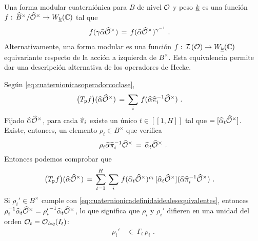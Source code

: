 Una forma modular cuaterni\'{o}nica para $B$ de nivel $\cal{O}$ y peso
$\peso{k}$ es una funci\'{o}n
\begin{math}
	f:\,\Idfin{B}/\Idfin{\cal{O}}\rightarrow W_{\peso{k}}(\bb{C})
\end{math}
tal que
\begin{align*}
	f(\gamma\hhat{\alpha}\Idfin{\cal{O}}) & \,=\,
		f(\hhat{\alpha}\Idfin{\cal{O}})^{\gamma^{-1}}
	\text{ .}
\end{align*}
%
Alternativamente, una forma modular es una funci\'{o}n
$f:\,\ideales{\cal{O}}\rightarrow W_{\peso{k}}(\bb{C})$ equivariante respecto
de la acci\'{o}n a izquierda de $B^{\times}$. Esta equivalencia permite dar una
descripci\'{o}n alternativa de los operadores de Hecke.

Seg\'{u}n \eqref{eq:cuaternionicasoperadorcoclase},
\begin{align*}
	\big(T_{\frak{p}}f\big)(\hhat{\alpha}\Idfin{\cal{O}}) & \,=\,
		\sum_{i}\,f(\hhat{\alpha}\hhat{\pi}_{i}^{-1}\Idfin{\cal{O}})
	\text{ .}
\end{align*}
%
Fijado $\hhat{\alpha}\Idfin{\cal{O}}$, para cada $\hhat{\pi}_{i}$ existe un
\'{u}nico $t\in [\![1,H]\!]$ tal que
\begin{math}
	[\hhat\alpha\hhat\pi_i^{-1}\Idfin{\cal O}]=
		[\hhat\alpha_t\Idfin{\cal O}]
\end{math}. Existe, entonces, un elemento $\rho_{i}\in B^{\times}$ que verifica
\begin{equation}
	\label{eq:cuaternionicadefinidaidealesequivalentes}
	\rho_{i}\hhat{\alpha}\hhat{\pi}_{i}^{-1}\Idfin{\cal{O}} \,=\,
		\hhat{\alpha}_{t}\Idfin{\cal{O}}
	\text{ .}
\end{equation}
%
Entonces podemos comprobar que
\begin{align*}
	\big(T_{\frak p}f\big)(\hhat\alpha\Idfin{\cal O}) & \,=\,
		\sum_{t=1}^H\,\sum_i\,f(\hhat\alpha_t\Idfin{\cal O})^{\rho_i}\,
			[\hhat\alpha_t\Idfin{\cal O}]
				(\hhat\alpha\hhat\pi_i^{-1}\Idfin{\cal O})
	\text{ .}
\end{align*}
%
Si $\rho_{i}'\in B^\times$ cumple con
\eqref{eq:cuaternionicadefinidaidealesequivalentes}, entonces
\begin{math}
	\rho_i^{-1}\hhat\alpha_t\Idfin{\cal O}=
		{\rho_i'}^{-1}\hhat\alpha_t\Idfin{\cal O}
\end{math}, lo que significa que $\rho_i$ y $\rho_i'$ difieren en una unidad
del orden $\cal{O}_{t}=\Oizq(I_{t})$:
\begin{align*}
	\rho_i' & \,\in\,\Gamma_t\,\rho_i
	\text{ .}
\end{align*}
%

